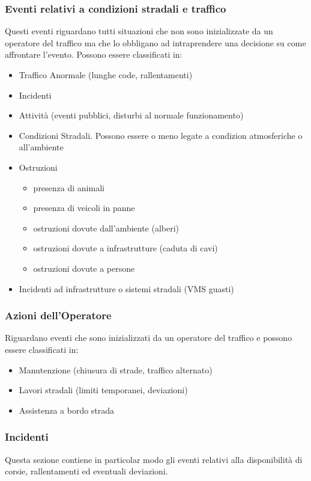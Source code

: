\subsubsection{Eventi relativi a condizioni stradali e traffico}
Questi eventi riguardano tutti situazioni che non sono inizializzate da un operatore del traffico ma che lo obbligano ad intraprendere una decisione su come affrontare l'evento. Possono essere classificati in:
\begin{itemize}
	\item Traffico Anormale (lunghe code, rallentamenti)
	\item Incidenti
	\item Attività (eventi pubblici, disturbi al normale funzionamento)
	\item Condizioni Stradali. Possono essere o meno legate a condizion atmosferiche o all'ambiente
	\item Ostruzioni
	\begin{itemize}
		\item presenza di animali
		\item presenza di veicoli in panne
		\item ostruzioni dovute dall'ambiente (alberi)
		\item ostruzioni dovute a infrastrutture (caduta di cavi)
		\item ostruzioni dovute a persone
	\end{itemize}
	\item Incidenti ad infrastrutture o sistemi stradali (VMS guasti)
\end{itemize}

\subsubsection{Azioni dell'Operatore}
Riguardano eventi che sono inizializzati da un operatore del traffico e possono essere classificati in:
\begin{itemize}
	\item Manutenzione (chiusura di strade, traffico alternato)
	\item Lavori stradali (limiti temporanei, deviazioni)
	\item Assistenza a bordo strada
\end{itemize}

\subsubsection{Incidenti}
Questa sezione contiene in particolar modo gli eventi relativi alla disponibilità di corsie, rallentamenti ed eventuali deviazioni.

